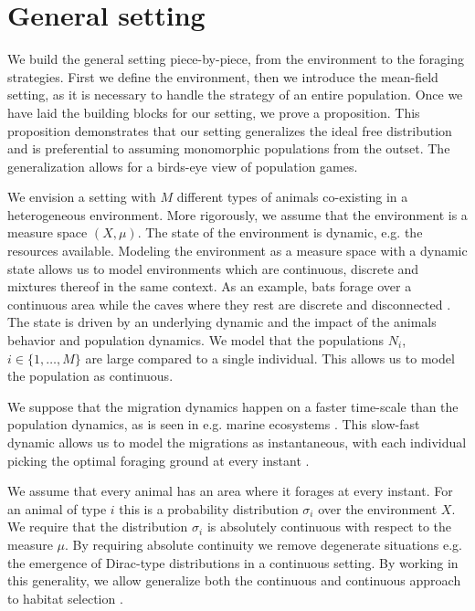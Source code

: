 \section{General setting}
\label{sec:general_setting}
We build the general setting piece-by-piece, from the environment to the foraging strategies. First we define the environment, then we introduce the mean-field setting, as it is necessary to handle the strategy of an entire population. Once we have laid the building blocks for our setting, we prove a proposition. This proposition demonstrates that our setting generalizes the ideal free distribution and is preferential to assuming monomorphic populations from the outset. The generalization allows for a birds-eye view of population games.

We envision a setting with $M$ different types of animals co-existing in a heterogeneous environment.  More rigorously, we assume that the environment is a measure space $(X,\mu)$. The state of the environment is dynamic, e.g. the resources available. Modeling the environment as a measure space with a dynamic state allows us to model environments which are continuous, discrete and mixtures thereof in the same context. As an example, bats forage over a continuous area while the caves where they rest are discrete and disconnected \citep{collet2019algorithmic}. The state is driven by an underlying dynamic and the impact of the animals behavior and population dynamics. We model that the populations $N_i$, $i\in \{1,\dots,M\}$  are large compared to a single individual. This allows us to model the population as continuous. %


We suppose that the migration dynamics happen on a faster time-scale than the population dynamics, as is seen in e.g. marine ecosystems \citep{iwasa1982vertical}. This slow-fast dynamic allows us to model the migrations as instantaneous, with each individual picking the optimal foraging ground at every instant \citep{kvrivan2013behavioral, cressman2006migration}.


We assume that every animal has an area where it forages at every instant. For an animal of type $i$ this is a probability distribution $\sigma_i$ over the environment $X$. We require that the distribution $\sigma_i$ is absolutely continuous with respect to the measure $\mu$.  By requiring absolute continuity we remove degenerate situations e.g. the emergence of Dirac-type distributions in a continuous setting. By working in this generality, we allow generalize both the continuous and continuous approach to habitat selection \citep{fretwell1969territorial, broom2013game, verticalmigration}.


